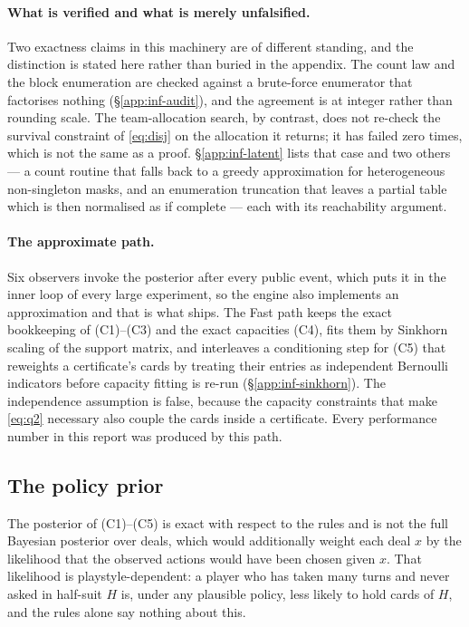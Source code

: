 \paragraph{What is verified and what is merely unfalsified.} Two exactness claims
in this machinery are of different standing, and the distinction is stated here
rather than buried in the appendix. The count law and the block enumeration are
checked against a brute-force enumerator that factorises nothing
(\S\ref{app:inf-audit}), and the agreement is at integer rather than rounding
scale. The team-allocation search, by contrast, does not re-check the survival
constraint of \eqref{eq:disj} on the allocation it returns; it has failed zero
times, which is not the same as a proof. \S\ref{app:inf-latent} lists that case
and two others --- a count routine that falls back to a greedy approximation for
heterogeneous non-singleton masks, and an enumeration truncation that leaves a
partial table which is then normalised as if complete --- each with its
reachability argument.

\paragraph{The approximate path.} Six observers invoke the posterior after every
public event, which puts it in the inner loop of every large experiment, so the
engine also implements an approximation and that is what ships. The Fast path
keeps the exact bookkeeping of (C1)--(C3) and the exact capacities (C4), fits
them by Sinkhorn scaling of the support matrix, and interleaves a conditioning
step for (C5) that reweights a certificate's cards by treating their entries as
independent Bernoulli indicators before capacity fitting is re-run
(\S\ref{app:inf-sinkhorn}). The independence assumption is false, because the
capacity constraints that make \eqref{eq:q2} necessary also couple the cards
inside a certificate. Every performance number in this report was produced by
this path.

\subsection{The policy prior}
\label{sec:belief-prior}

The posterior of (C1)--(C5) is exact with respect to the rules and is not the
full Bayesian posterior over deals, which would additionally weight each deal $x$
by the likelihood that the observed actions would have been chosen given $x$.
That likelihood is playstyle-dependent: a player who has taken many turns and
never asked in half-suit $H$ is, under any plausible policy, less likely to hold
cards of $H$, and the rules alone say nothing about this.

